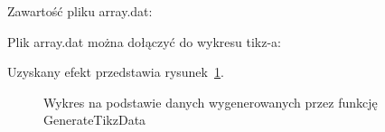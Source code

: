Zawartość pliku array.dat:


Plik array.dat można dołączyć do wykresu tikz-a: 


Uzyskany efekt przedstawia rysunek~\ref{Fig:array}.

\begin{figure}

\caption{Wykres na podstawie danych wygenerowanych przez funkcję GenerateTikzData}
\label{Fig:array}
\end{figure}
